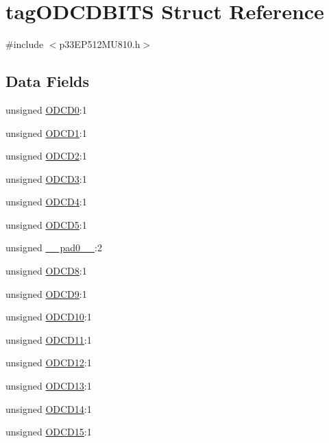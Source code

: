 \hypertarget{structtag_o_d_c_d_b_i_t_s}{}\section{tag\+O\+D\+C\+D\+B\+I\+TS Struct Reference}
\label{structtag_o_d_c_d_b_i_t_s}


{\ttfamily \#include $<$p33\+E\+P512\+M\+U810.\+h$>$}

\subsection*{Data Fields}
\begin{DoxyCompactItemize}
\item 
unsigned \hyperlink{structtag_o_d_c_d_b_i_t_s_a46045159f89a3991e3ee39afc7b3d608}{O\+D\+C\+D0}\+:1
\item 
unsigned \hyperlink{structtag_o_d_c_d_b_i_t_s_ac7507b4deaa9cc2b9b99410c5a6006ca}{O\+D\+C\+D1}\+:1
\item 
unsigned \hyperlink{structtag_o_d_c_d_b_i_t_s_aeb53f43605ef25253b869b31dd24cd86}{O\+D\+C\+D2}\+:1
\item 
unsigned \hyperlink{structtag_o_d_c_d_b_i_t_s_a152f5600f4bae4779bae7a81abdc95b7}{O\+D\+C\+D3}\+:1
\item 
unsigned \hyperlink{structtag_o_d_c_d_b_i_t_s_a21d291595d199822d0a9315da074f063}{O\+D\+C\+D4}\+:1
\item 
unsigned \hyperlink{structtag_o_d_c_d_b_i_t_s_aedeeec8f722183f5952a1c62489e7fb1}{O\+D\+C\+D5}\+:1
\item 
unsigned \hyperlink{structtag_o_d_c_d_b_i_t_s_adf71f3d8410c1f1dbbc96680a92c49af}{\+\_\+\+\_\+pad0\+\_\+\+\_\+}\+:2
\item 
unsigned \hyperlink{structtag_o_d_c_d_b_i_t_s_a55ddea32b9c37940546ff373ca983926}{O\+D\+C\+D8}\+:1
\item 
unsigned \hyperlink{structtag_o_d_c_d_b_i_t_s_ada6820368670c9c3cd2dbaa8ab262c47}{O\+D\+C\+D9}\+:1
\item 
unsigned \hyperlink{structtag_o_d_c_d_b_i_t_s_af837a7438a99db41657c3e0464e9ec4e}{O\+D\+C\+D10}\+:1
\item 
unsigned \hyperlink{structtag_o_d_c_d_b_i_t_s_a148913e25de400d85eefee2752c4e250}{O\+D\+C\+D11}\+:1
\item 
unsigned \hyperlink{structtag_o_d_c_d_b_i_t_s_a0db0c0eb3a4b03f05661de96f10d10f6}{O\+D\+C\+D12}\+:1
\item 
unsigned \hyperlink{structtag_o_d_c_d_b_i_t_s_a8786efa8d291c1707860cce647cb3704}{O\+D\+C\+D13}\+:1
\item 
unsigned \hyperlink{structtag_o_d_c_d_b_i_t_s_af625f46e0ea924bac94f6aa5b4abbc38}{O\+D\+C\+D14}\+:1
\item 
unsigned \hyperlink{structtag_o_d_c_d_b_i_t_s_a917e6c5574df912f83fbdd6df97d98e9}{O\+D\+C\+D15}\+:1
\end{DoxyCompactItemize}


